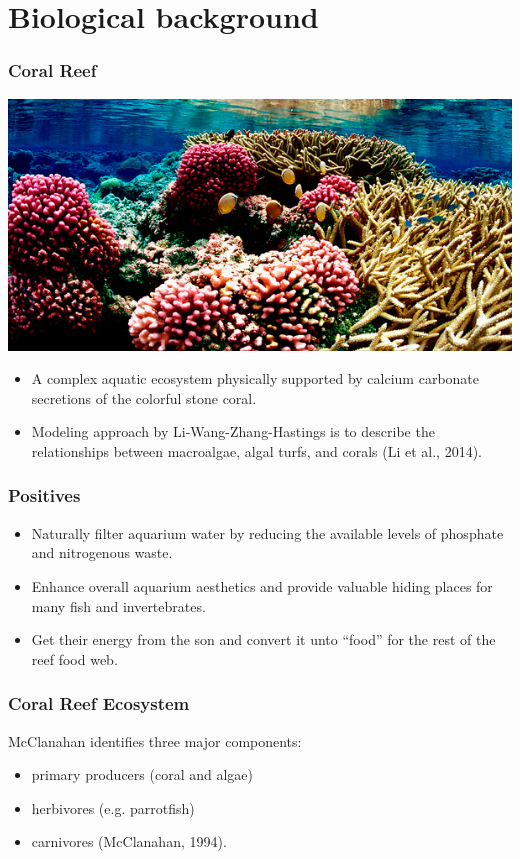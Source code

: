 
\section{Biological background}

\begin{frame}
\frametitle{Coral Reef}
\includegraphics[scale=.175]{./US-Wildlife-coral-1.jpg}
\begin{itemize}
\item A complex aquatic ecosystem physically supported by calcium carbonate secretions of the colorful stone coral. \\
\item Modeling approach by Li-Wang-Zhang-Hastings is to describe the relationships between macroalgae, algal turfs, and corals (Li et al., 2014).
\end{itemize}
\end{frame}

\begin{frame}
\frametitle{Positives}
\begin{itemize}
\item Naturally filter aquarium water by reducing the available levels of phosphate and nitrogenous waste.
\item Enhance overall aquarium aesthetics and provide valuable hiding places for many fish and invertebrates.
\item Get their energy from the son and convert it unto “food” for the rest of the reef food web. 
\end{itemize}
\end{frame}

\begin{frame}
\frametitle{Coral Reef Ecosystem} 

McClanahan identifies three major components:
\begin{itemize}
\item primary producers (coral and algae)\\
\item herbivores (e.g. parrotfish)\\
\item carnivores (McClanahan, 1994).
\end{itemize}
\end{frame}

